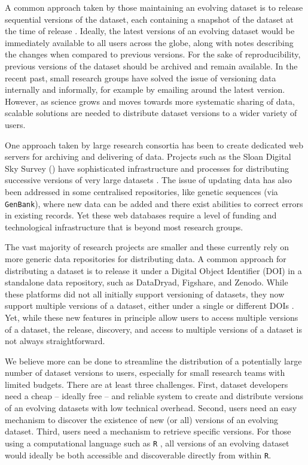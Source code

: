 \documentclass[a4paper,num-refs]{assets/oup-contemporary}
\begin{document}
A common approach taken by those maintaining an evolving dataset is to release sequential versions of the dataset, each containing a snapshot of the dataset at the time of release \cite[e.g.][]{Falster-2015, Pennell-2015a, Yenni-2018, Abolfathi-2018}. Ideally, the latest versions of an evolving dataset would be immediately available to all users across the globe, along with notes describing the changes when compared to previous versions. For the sake of reproducibility, previous versions of the dataset should be archived and remain available. In the recent past, small research groups have solved the issue of versioning data internally and informally, for example by emailing around the latest version. However, as science grows and moves towards more systematic sharing of data, scalable solutions are needed to distribute dataset versions to a wider variety of users.

One approach taken by large research consortia has been to create dedicated web servers for archiving and delivering of data. Projects such as the Sloan Digital Sky Survey () have sophisticated infrastructure and processes for distributing successive versions of very large datasets \cite{Abolfathi-2018}. The issue of updating data has also been addressed in some centralised repositories, like genetic sequences (via \texttt{GenBank}), where new data can be added and there exist abilities to correct errors in existing records. Yet these web databases require a level of funding and technological infrastructure that is beyond most research groups.

The vast majority of research projects are smaller and these currently rely on more generic data repositories for distributing data. A common approach for distributing a dataset is to release it under a Digital Object Identifier (DOI) in a standalone data repository, such as DataDryad, Figshare, and Zenodo. While these platforms did not all initially support versioning of datasets, they now support multiple versions of a dataset, either under a single or different DOIs \cite{Nielsen-2017}. Yet, while these new features in principle allow users to access multiple versions of a dataset, the release, discovery, and access to multiple versions of a dataset is not always straightforward.

We believe more can be done to streamline the distribution of a potentially large number of dataset versions to users, especially for small research teams with limited budgets. There are at least three challenges. First, dataset developers need a cheap -- ideally free -- and reliable system  to create and distribute versions of an evolving datasets with low technical overhead. Second, users need an easy mechanism to discover the existence of new (or all) versions of an evolving dataset. Third, users need a mechanism to retrieve specific versions. For those using a computational language such as \texttt{R} \cite{R-2017}, all versions of an evolving dataset would ideally be both accessible and discoverable directly from within \texttt{R}.
\end{document}
